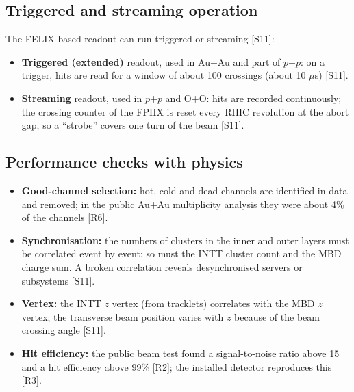 \documentclass[11pt,letterpaper]{article}
\begin{document}
\subsection{Triggered and streaming operation}
The FELIX-based readout can run triggered or streaming [S11]:
\begin{itemize}
\item \textbf{Triggered (extended)} readout, used in Au+Au and part of $p$+$p$: on a trigger, hits are read for a window of about 100 crossings (about 10 $\mu$s) [S11].
\item \textbf{Streaming} readout, used in $p$+$p$ and O+O: hits are recorded continuously; the crossing counter of the FPHX is reset every RHIC revolution at the abort gap, so a ``strobe'' covers one turn of the beam [S11].
\end{itemize}

\subsection{Performance checks with physics}
\begin{itemize}
\item \textbf{Good-channel selection:} hot, cold and dead channels are identified in data and removed; in the public Au+Au multiplicity analysis they were about 4\% of the channels [R6].
\item \textbf{Synchronisation:} the numbers of clusters in the inner and outer layers must be correlated event by event; so must the INTT cluster count and the MBD charge sum. A broken correlation reveals desynchronised servers or subsystems [S11].
\item \textbf{Vertex:} the INTT $z$ vertex (from tracklets) correlates with the MBD $z$ vertex; the transverse beam position varies with $z$ because of the beam crossing angle [S11].
\item \textbf{Hit efficiency:} the public beam test found a signal-to-noise ratio above 15 and a hit efficiency above 99\% [R2]; the installed detector reproduces this [R3].
\end{itemize}
\end{document}
